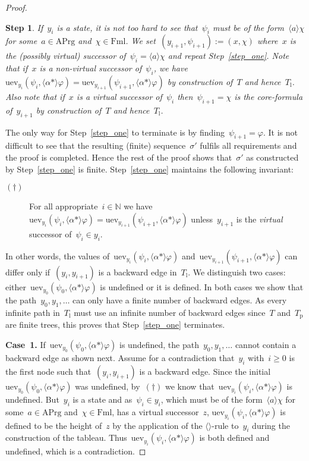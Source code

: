 \documentclass{entcs}
\newtheorem{stp}{Step}
\newenvironment{step}{\vspace{-\lastskip}\par \addvspace{.6pc
    plus .2pc minus .1pc}\begin{stp}\rm}{\end{stp}\par\addvspace{.6pc
    plus .2pc minus .1pc}}
\newcommand{\Nat}{{\mathbb N}}
\newcommand{\pea}[2]{\langle#1\rangle #2}
\newcommand{\prp}[1]{#1*}
\newcommand{\fml}{\mathrm{Fml}}
\newcommand{\act}{\mathrm{APrg}}
\newcommand{\tuev}{\mathrm{uev}}
\newcommand{\trea}{$\langle\rangle$}
\newcommand{\tm}{T_{\mathrm{p}}}
\newcommand{\tl}{T_{\mathrm{l}}}
\newcommand{\fchn}{\sigma}
\begin{document}
\begin{proof}
\begin{step}
    If~$y_i$ is a state,
    it is not too hard to see that~$\psi_i$ must be of the form~$\pea{a}{\chi}$
    for some~$a \in \act$ and~$\chi \in \fml$.
    We set~$(y_{i+1}, \psi_{i+1}) := (x, \chi)$
    where~$x$ is the (possibly virtual) successor of~$\psi_i = \pea{a}{\chi}$
    and repeat Step~\ref{step_one}.
    Note that if~$x$ is a non-virtual successor of~$\psi_i$,
    we have~$\tuev_{y_i}(\psi_i, \pea{\prp{\alpha}}{\varphi}) = \tuev_{y_{i+1}}(\psi_{i+1}, \pea{\prp{\alpha}}{\varphi})$
    by construction of~$T$ and hence~$\tl$.
    Also note that if~$x$ is a virtual successor of~$\psi_i$
    then~$\psi_{i+1} = \chi$ is the core-formula of~$y_{i+1}$ by construction of~$T$ and hence~$\tl$.
  \end{step}
  The only way for Step~\ref{step_one} to terminate is
  by finding~$\psi_{i+1} = \varphi$.
  It is not difficult to see that
  the resulting (finite) sequence~$\fchn'$ fulfils all requirements and the proof is completed.
  Hence the rest of the proof shows that~$\fchn'$ as constructed by Step~\ref{step_one} is finite.
  Step~\ref{step_one} maintains the following invariant:
  \begin{description}
  \item[$(\dagger)$] For all appropriate~$i \in \Nat$
    we have~$\tuev_{y_i}(\psi_i, \pea{\prp{\alpha}}{\varphi}) = \tuev_{y_{i+1}}(\psi_{i+1}, \pea{\prp{\alpha}}{\varphi})$
    unless~$y_{i+1}$ is the \emph{virtual} successor of~$\psi_i \in y_i$.
  \end{description}
  In other words, the values of~$\tuev_{y_i}(\psi_i, \pea{\prp{\alpha}}{\varphi})$
  and~$\tuev_{y_{i+1}}(\psi_{i+1}, \pea{\prp{\alpha}}{\varphi})$ can differ only if~$(y_i, y_{i+1})$ is a backward edge in~$\tl$.
  We distinguish two cases: either~$\tuev_{y_0}(\psi_0, \pea{\prp{\alpha}}{\varphi})$ is undefined or it is defined.
  In both cases we show that the path~$y_0, y_1, \dotsc$
  can only have a finite number of backward edges.
  As every infinite path in~$\tl$ must use an infinite number of backward edges
  since~$T$ and~$\tm$ are finite trees,
  this proves that Step~\ref{step_one} terminates.

  \noindent{}\textbf{Case~1.} If~$\tuev_{y_0}(\psi_0, \pea{\prp{\alpha}}{\varphi})$ is undefined,
  the path~$y_0, y_1, \dotsc$ cannot contain a backward edge as shown next.
  Assume for a contradiction that~$y_i$ with~$i \geq 0$ is the first node
  such that~$(y_i, y_{i+1})$ is a backward edge.
  Since the initial $\tuev_{y_0}(\psi_0, \pea{\prp{\alpha}}{\varphi})$ was undefined,
  by~$(\dagger)$ we know that~$\tuev_{y_i}(\psi_i, \pea{\prp{\alpha}}{\varphi})$ is undefined.
  But~$y_i$ is a state and as~$\psi_i \in y_i$,
  which must be of the form~$\pea{a}{\chi}$ for some~$a \in \act$ and~$\chi \in \fml$,
  has a virtual successor~$z$,
  $\tuev_{y_i}(\psi_i, \pea{\prp{\alpha}}{\varphi})$ is defined
  to be the height of~$z$ by the application of the \trea{}-rule to~$y_i$
  during the construction of the tableau.
  Thus~$\tuev_{y_i}(\psi_i, \pea{\prp{\alpha}}{\varphi})$ is both defined and undefined,
  which is a contradiction.


\end{proof}
\end{document}
